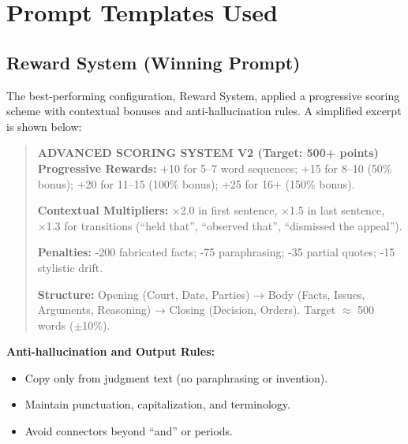 \documentclass[sigconf]{acmart}
\begin{document}

\clearpage
\appendix

\section{Prompt Templates Used}

\subsection{Reward System (Winning Prompt)}
\noindent The best-performing configuration, Reward System, applied a progressive scoring scheme with contextual bonuses and anti-hallucination rules. A simplified excerpt is shown below:

\begin{quote}\small
\textbf{ADVANCED SCORING SYSTEM V2 (Target: 500+ points)}  
\textbf{Progressive Rewards:}  
+10 for 5–7 word sequences; +15 for 8–10 (50\% bonus); +20 for 11–15 (100\% bonus); +25 for 16+ (150\% bonus).  

\textbf{Contextual Multipliers:}  
×2.0 in first sentence, ×1.5 in last sentence, ×1.3 for transitions (\enquote{held that}, \enquote{observed that}, \enquote{dismissed the appeal}).  

\textbf{Penalties:}  
-200 fabricated facts; -75 paraphrasing; -35 partial quotes; -15 stylistic drift.

\textbf{Structure:}  
Opening (Court, Date, Parties) → Body (Facts, Issues, Arguments, Reasoning) → Closing (Decision, Orders).  
Target $\approx$ 500 words ($\pm$10\%).
\end{quote}

\vspace{3pt}
\noindent\textbf{Anti-hallucination and Output Rules:}
\begin{itemize}\setlength\itemsep{1pt}
  \item Copy only from judgment text (no paraphrasing or invention).
  \item Maintain punctuation, capitalization, and terminology.
  \item Avoid connectors beyond “and” or periods.
\end{itemize}
\end{document}
